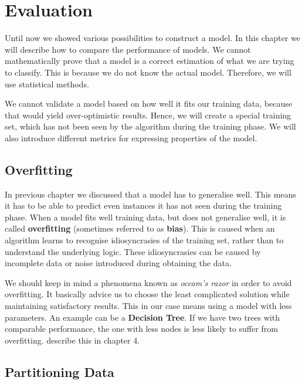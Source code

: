 \chapter{Evaluation}
\label{chap:eval}

Until now we showed various possibilities to construct a model.
In this chapter we will describe how to compare the performance of models.
We cannot mathematically prove that a model is a correct estimation of what we are trying to classify.
This is because we do not know the actual model.
Therefore, we will use statistical methods.

We cannot validate a model based on how well it fits our training data, because that would yield over-optimistic results.
Hence, we will create a special training set, which has not been seen by the algorithm during the training phase.
We will also introduce different metrics for expressing properties of the model.

\section{Overfitting}

In previous chapter  we discussed that a model has to generalise well. This means it has to be able to predict even
instances it has not seen during the training phase. When a model fits well training data, but does not generalise well, it is called
{\bf overfitting} (sometimes referred to as {\bf bias}).
This is caused when an algorithm learns to recognise idiosyncrasies of the training set, rather than to understand the underlying logic.
These idiosyncrasies can be caused by incomplete data or noise introduced during obtaining the data.

We should keep in mind a phenomena known as {\it occam's razor} in order to avoid overfitting. 
It basically advice us to choose the least complicated solution while
maintaining satisfactory results.
This in our case means using a model with less parameters. An example can be a {\bf Decision Tree}.
If we have two trees with comparable performance, the one with less nodes is less likely to suffer from overfitting. \citet{TanBachKum08} describe this in chapter 4.


\section{Partitioning Data}

